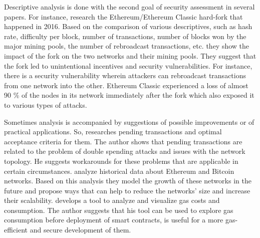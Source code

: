 Descriptive analysis is done with the second goal of security assessment in several papers. 
For instance, \cite{kiffer2017stick} research the Ethereum/Ethereum Classic hard-fork that happened in 2016. 
Based on the comparison of various descriptives, such as hash rate, difficulty per block, number of transactions, number of blocks won by the major mining pools, the number of rebroadcast transactions, etc. they show the impact of the fork on the two networks and their mining pools.
They suggest that the fork led to unintentional incentives and security vulnerabilities. 
For instance, there is a security vulnerability wherein attackers can rebroadcast transactions from one network into the other.
Ethereum Classic experienced a loss of almost 90 \% of the nodes in its network immediately after the fork which also exposed it to various types of attacks.

Sometimes analysis is accompanied by suggestions of possible improvements or of practical applications. 
So, \cite{bentkeanalysis} researches pending transactions and optimal acceptance criteria for them. 
The author shows that pending transactions are related to the problem of double spending attacks and issues with the network topology.
He suggests workarounds for these problems that are applicable in certain circumstances.  
\cite{dennis2019analysis} analyze historical data about Ethereum and Bitcoin networks. 
Based on this analysis they model the growth of these networks in the future and propose ways that can help to reduce the networks' size and increase their scalability.
\cite{signer2018gas} develops a tool to analyze and visualize gas costs and consumption.
The author suggests that his tool can be used to explore gas consumption before deployment of smart contracts, is useful for a more gas-efficient and secure development of them. 



